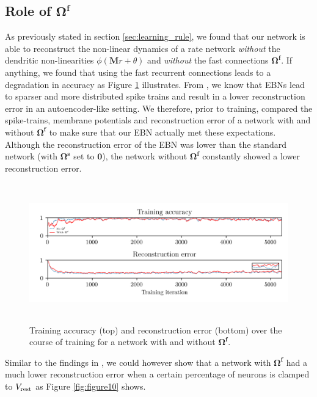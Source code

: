 \documentclass[twoside,11pt,titlepage]{article}
\begin{document}
\subsection{Role of $\mathbf{\Omega^f}$}
As previously stated in section \ref{sec:learning_rule}, we found that our network is able to reconstruct the non-linear dynamics
of a rate network \textit{without} the dendritic non-linearities $\phi(\mathbf{M}r+\theta)$ and \textit{without} the fast connections $\mathbf{\Omega^f}$.  
If anything, we found that using the fast recurrent connections leads to a degradation in accuracy as Figure \ref{fig:figure9} illustrates.
From \cite{Bourdoukan:2012:LOS:2999325.2999390}, we know that EBNs lead to sparser and more distributed spike trains and result in a
lower reconstruction error in an autoencoder-like setting. We therefore, prior to training, compared the spike-trains, membrane potentials and
reconstruction error of a network with and without $\mathbf{\Omega^f}$ to make sure that our EBN actually met these expectations. Although the
reconstruction error of the EBN was lower than the standard network (with $\mathbf{\Omega^s}$ set to $\mathbf{0}$), the network without $\mathbf{\Omega^f}$
constantly showed a lower reconstruction error.

\begin{figure}[!htb]
  \includegraphics[width = \columnwidth, height=6cm]{figures/figure9.png}
  \caption{Training accuracy (top) and reconstruction error (bottom) over the course of
  training for a network with and without $\mathbf{\Omega^f}$.}
  \label{fig:figure9}
\end{figure}

Similar to the findings in \cite{alemi2017learning}, we could however show that a network with $\mathbf{\Omega^f}$ had a much lower
reconstruction error when a certain percentage of neurons is clamped to $V_{\textnormal{rest}}$ as Figure \ref{fig:figure10} shows.
\end{document}

